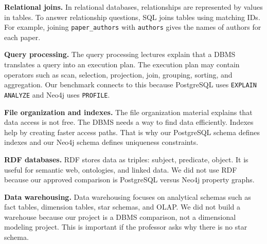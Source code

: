 \documentclass[11pt]{article}
\begin{document}
\textbf{Relational joins.}
In relational databases, relationships are represented by values in tables.
To answer relationship questions, SQL joins tables using matching IDs.
For example, joining \texttt{paper\_authors} with \texttt{authors} gives the names of authors for each paper.

\textbf{Query processing.}
The query processing lectures explain that a DBMS translates a query into an execution plan.
The execution plan may contain operators such as scan, selection, projection, join, grouping, sorting, and aggregation.
Our benchmark connects to this because PostgreSQL uses \texttt{EXPLAIN ANALYZE} and Neo4j uses \texttt{PROFILE}.

\textbf{File organization and indexes.}
The file organization material explains that data access is not free.
The DBMS needs a way to find data efficiently.
Indexes help by creating faster access paths.
That is why our PostgreSQL schema defines indexes and our Neo4j schema defines uniqueness constraints.

\textbf{RDF databases.}
RDF stores data as triples: subject, predicate, object.
It is useful for semantic web, ontologies, and linked data.
We did not use RDF because our approved comparison is PostgreSQL versus Neo4j property graphs.

\textbf{Data warehousing.}
Data warehousing focuses on analytical schemas such as fact tables, dimension tables, star schemas, and OLAP.
We did not build a warehouse because our project is a DBMS comparison, not a dimensional modeling project.
This is important if the professor asks why there is no star schema.
\end{document}
